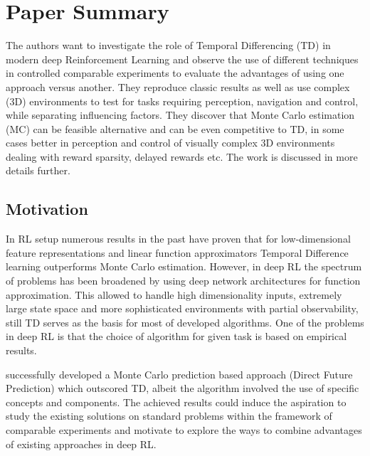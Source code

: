 \documentclass{article}
\begin{document}
\section{Paper Summary}
The authors want to investigate the role of Temporal Differencing (TD)
in modern deep Reinforcement Learning and observe the use of
different techniques in controlled comparable experiments to evaluate the
advantages of using one approach versus another.
They reproduce classic results as well as use
complex (3D) environments to test for tasks requiring perception,
navigation and control, while separating influencing factors.
They discover that Monte Carlo estimation
(MC) can be feasible alternative and can be even competitive to TD,
in some cases better
in perception and control of visually complex 3D environments
dealing with reward sparsity, delayed rewards etc.
The work is discussed in more details further.

\subsection{Motivation}
In RL setup numerous results in the past have proven
that for low-dimensional feature representations and linear function
approximators Temporal Difference learning outperforms
Monte Carlo estimation. However, in deep RL the spectrum of problems
has been broadened by using deep network architectures for function
approximation. This allowed to handle high dimensionality inputs,
extremely large state space and more sophisticated environments with partial
observability, still TD serves as the basis for
most of developed algorithms. One of the problems in deep RL is that
the choice of algorithm for given task is based on empirical results.

\citet{DBLP:journals/corr/DosovitskiyK16} successfully developed a Monte Carlo
prediction based approach (Direct Future Prediction) which outscored TD,
albeit the algorithm involved the use of specific concepts and
components. The achieved results
could induce the aspiration to study the existing solutions on standard
problems within the framework of comparable experiments and motivate
to explore the ways to combine advantages of existing approaches in deep RL.
\end{document}
